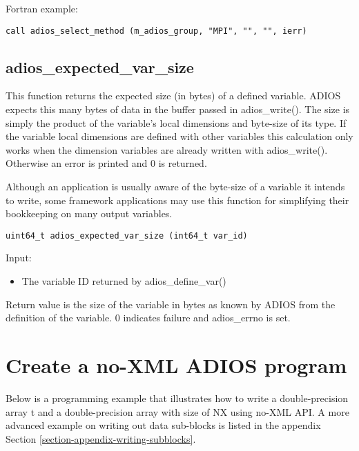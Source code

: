 Fortran example: 
\begin{lstlisting}[alsolanguage=Fortran,caption={},label={}]
call adios_select_method (m_adios_group, "MPI", "", "", ierr)
\end{lstlisting}


\subsection{adios\_expected\_var\_size}

This function returns the expected size (in bytes) of a defined variable. ADIOS expects this many bytes of data in the buffer passed in adios\_write(). 
The size is simply the product of the variable's local dimensions and byte-size of its type.
If the variable local dimensions are defined with other variables this calculation only works when the dimension variables are already written with adios\_write(). Otherwise an error is printed and 0 is returned.

Although an application is usually aware of the byte-size of a variable it intends to write, some framework applications may use this function for simplifying their bookkeeping on many output variables. 

\begin{lstlisting}[alsolanguage=C,caption={},label={}]
uint64_t adios_expected_var_size (int64_t var_id)
\end{lstlisting}

Input: 
\begin{itemize}
\item The variable ID returned by adios\_define\_var()
\end{itemize}

Return value is the size of the variable in bytes as known by ADIOS from the definition of the variable. 0 indicates failure and adios\_errno is set.



\section{Create a no-XML ADIOS program}

Below is a programming example that illustrates how to write a double-precision 
array t and a double-precision array with size of NX using no-XML API.
A more advanced example on writing out data sub-blocks is listed in the 
appendix Section \ref{section-appendix-writing-subblocks}. 

